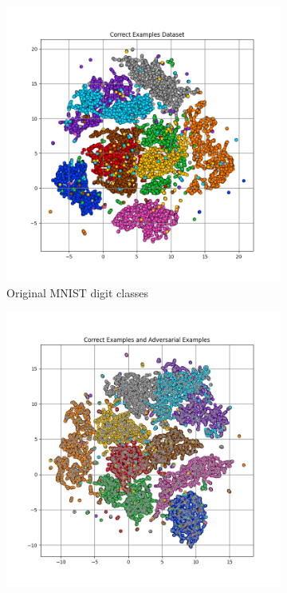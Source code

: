 \documentclass[10pt, conference, a4paper, final]{IEEEtran}
\begin{document}
\begin{figure}[!ht]
    \centering
    \begin{subfigure}{.50\textwidth}
        \centering
        \includegraphics[width=\linewidth]{paper_images/1.png}
        \caption{Original MNIST digit classes}
        \label{fig:umap_original}
    \end{subfigure}%
    \hfill
    \begin{subfigure}{.50\textwidth}
        \centering
        \includegraphics[width=\linewidth]{paper_images/2.png}

\end{subfigure}
\end{figure}
\end{document}
